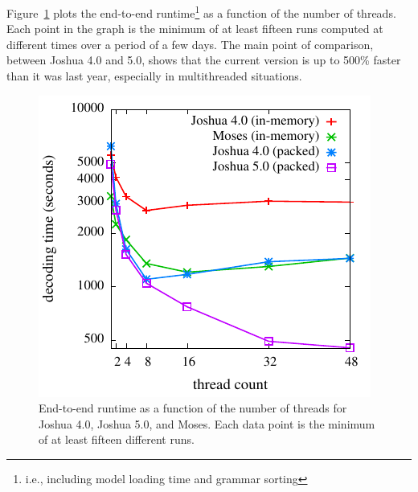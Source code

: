\documentclass[11pt]{article}
\begin{document}
Figure~\ref{fig:cmp} plots the end-to-end runtime\footnote{i.e.,
  including model loading time and grammar sorting} as a function of
the number of threads.  Each point in the graph is the minimum of at
least fifteen runs computed at different times over a period of a few
days.  The main point of comparison, between Joshua 4.0 and 5.0, shows
that the current version is up to 500\% faster than it was last year,
especially in multithreaded situations.

\begin{figure}[!t]
  \begin{center}
    \includegraphics[width=0.99\linewidth]{plots/runtimes.pdf}
  \end{center}
  \caption{End-to-end runtime as a function of the number of threads
    for Joshua 4.0, Joshua 5.0, and Moses. Each data point is the
    minimum of at least fifteen different runs.}
  \label{fig:cmp}
\end{figure}
\end{document}
